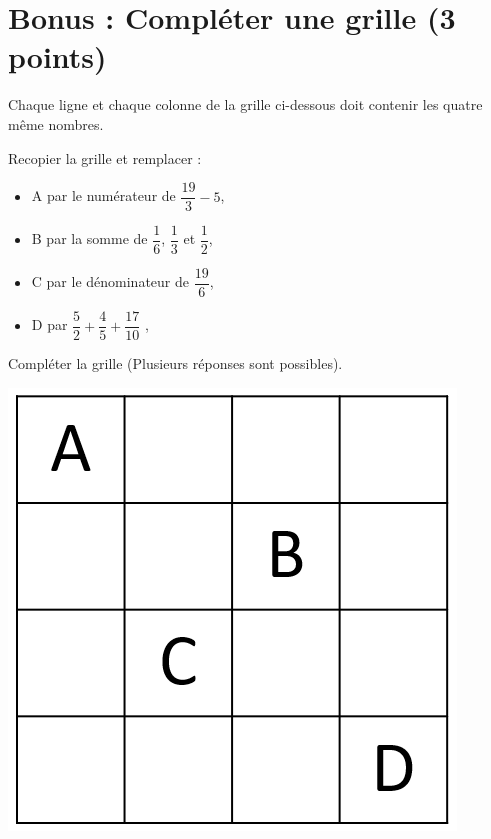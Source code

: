 \section{Bonus : Compléter une grille (3 points)}

Chaque ligne et chaque colonne  de la grille ci-dessous doit contenir les quatre même nombres.

\begin{multicols}{2}
	\begin{questions}
		\question[1] Recopier la grille et remplacer :
		
		\begin{itemize}
			\item A par le numérateur de $\dfrac{19}{3} - 5$,
			\item B par la somme de $\dfrac{1}{6}$, $\dfrac{1}{3}$ et $\dfrac{1}{2}$,
			\item C par le dénominateur de $\dfrac{19}{6}$,
			\item D par $\dfrac{5}{2} + \dfrac{4}{5} + \dfrac{17}{10}$ ,
		\end{itemize}
	
		\question[2] Compléter la grille (Plusieurs réponses sont possibles).
		
		
	\end{questions}

	\begin{center}
		\includegraphics[scale=0.5]{img/grille}
	\end{center}
\end{multicols}